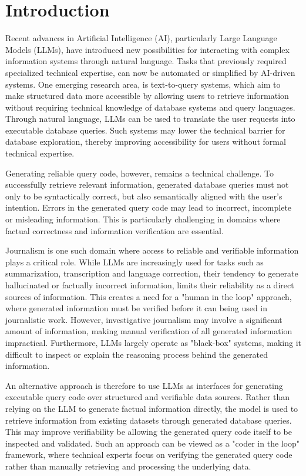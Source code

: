 \chapter{Introduction} \label{ch:intro}

Recent advances in Artificial Intelligence (AI), particularly Large Language Models (LLMs), have introduced new possibilities for interacting with complex information systems through natural language. Tasks that previously required specialized technical expertise, can now be automated or simplified by AI-driven systems. One emerging research area, is text-to-query systems, which aim to make structured data more accessible by allowing users to retrieve information without requiring technical knowledge of database systems and query languages. Through natural language, LLMs can be used to translate the user requests into executable database queries. Such systems may lower the technical barrier for database exploration, thereby improving accessibility for users without formal technical expertise. 

Generating reliable query code, however, remains a technical challenge. To successfully retrieve relevant information, generated database queries must not only to be syntactically correct, but also semantically aligned with the user's intention. Errors in the generated query code may lead to incorrect, incomplete or misleading information. This is particularly challenging in domains where factual correctness and information verification are essential. 

Journalism is one such domain where access to reliable and verifiable information plays a critical role. While LLMs are increasingly used for tasks such as summarization, transcription and language correction, their tendency to generate hallucinated or factually incorrect information, limits their reliability as a direct sources of information. This creates a need for a "human in the loop" approach, where generated information must be verified before it can being used in journalistic work. However, investigative journalism may involve a significant amount of information, making manual verification of all generated information impractical. Furthermore, LLMs largely operate as "black-box" systems, making it difficult to inspect or explain the reasoning process behind the generated information.

An alternative approach is therefore to use LLMs as interfaces for generating executable query code over structured and verifiable data sources. Rather than relying on the LLM to generate factual information directly, the model is used to retrieve information from existing datasets through generated database queries. This may improve verifiability be allowing the generated query code itself to be inspected and validated. Such an approach can be viewed as a "coder in the loop" framework, where technical experts focus on verifying the generated query code rather than manually retrieving and processing the underlying data. 


